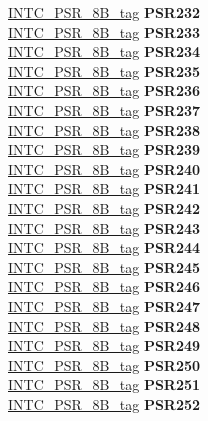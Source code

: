 \begin{DoxyCompactItemize}
\begin{tabbing}
\>\>\mbox{\hyperlink{unionINTC__PSR__8B__tag}{INTC\_PSR\_8B\_tag}} {\bfseries PSR232}\\
\>\>\mbox{\hyperlink{unionINTC__PSR__8B__tag}{INTC\_PSR\_8B\_tag}} {\bfseries PSR233}\\
\>\>\mbox{\hyperlink{unionINTC__PSR__8B__tag}{INTC\_PSR\_8B\_tag}} {\bfseries PSR234}\\
\>\>\mbox{\hyperlink{unionINTC__PSR__8B__tag}{INTC\_PSR\_8B\_tag}} {\bfseries PSR235}\\
\>\>\mbox{\hyperlink{unionINTC__PSR__8B__tag}{INTC\_PSR\_8B\_tag}} {\bfseries PSR236}\\
\>\>\mbox{\hyperlink{unionINTC__PSR__8B__tag}{INTC\_PSR\_8B\_tag}} {\bfseries PSR237}\\
\>\>\mbox{\hyperlink{unionINTC__PSR__8B__tag}{INTC\_PSR\_8B\_tag}} {\bfseries PSR238}\\
\>\>\mbox{\hyperlink{unionINTC__PSR__8B__tag}{INTC\_PSR\_8B\_tag}} {\bfseries PSR239}\\
\>\>\mbox{\hyperlink{unionINTC__PSR__8B__tag}{INTC\_PSR\_8B\_tag}} {\bfseries PSR240}\\
\>\>\mbox{\hyperlink{unionINTC__PSR__8B__tag}{INTC\_PSR\_8B\_tag}} {\bfseries PSR241}\\
\>\>\mbox{\hyperlink{unionINTC__PSR__8B__tag}{INTC\_PSR\_8B\_tag}} {\bfseries PSR242}\\
\>\>\mbox{\hyperlink{unionINTC__PSR__8B__tag}{INTC\_PSR\_8B\_tag}} {\bfseries PSR243}\\
\>\>\mbox{\hyperlink{unionINTC__PSR__8B__tag}{INTC\_PSR\_8B\_tag}} {\bfseries PSR244}\\
\>\>\mbox{\hyperlink{unionINTC__PSR__8B__tag}{INTC\_PSR\_8B\_tag}} {\bfseries PSR245}\\
\>\>\mbox{\hyperlink{unionINTC__PSR__8B__tag}{INTC\_PSR\_8B\_tag}} {\bfseries PSR246}\\
\>\>\mbox{\hyperlink{unionINTC__PSR__8B__tag}{INTC\_PSR\_8B\_tag}} {\bfseries PSR247}\\
\>\>\mbox{\hyperlink{unionINTC__PSR__8B__tag}{INTC\_PSR\_8B\_tag}} {\bfseries PSR248}\\
\>\>\mbox{\hyperlink{unionINTC__PSR__8B__tag}{INTC\_PSR\_8B\_tag}} {\bfseries PSR249}\\
\>\>\mbox{\hyperlink{unionINTC__PSR__8B__tag}{INTC\_PSR\_8B\_tag}} {\bfseries PSR250}\\
\>\>\mbox{\hyperlink{unionINTC__PSR__8B__tag}{INTC\_PSR\_8B\_tag}} {\bfseries PSR251}\\
\>\>\mbox{\hyperlink{unionINTC__PSR__8B__tag}{INTC\_PSR\_8B\_tag}} {\bfseries PSR252}\\

\end{tabbing}
\end{DoxyCompactItemize}
